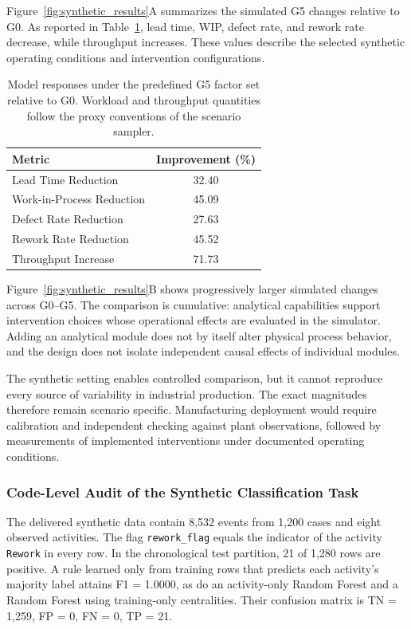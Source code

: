 Figure~\ref{fig:synthetic_results}A summarizes the simulated G5 changes relative to G0. As reported in Table~\ref{tab:synthetic_improvements}, lead time, WIP, defect rate, and rework rate decrease, while throughput increases. These values describe the selected synthetic operating conditions and intervention configurations.

\begin{table}[t]
\caption{
Model responses under the predefined G5 factor set relative to G0. Workload and throughput quantities follow the proxy conventions of the scenario sampler.
}
\label{tab:synthetic_improvements}
\centering
\begin{tabular}{lc}
\toprule
\textbf{Metric} & \textbf{Improvement (\%)} \\
\midrule
Lead Time Reduction & 32.40 \\
Work-in-Process Reduction & 45.09 \\
Defect Rate Reduction & 27.63 \\
Rework Rate Reduction & 45.52 \\
Throughput Increase & 71.73 \\
\bottomrule
\end{tabular}
\end{table}

Figure~\ref{fig:synthetic_results}B shows progressively larger simulated changes across G0--G5. The comparison is cumulative: analytical capabilities support intervention choices whose operational effects are evaluated in the simulator. Adding an analytical module does not by itself alter physical process behavior, and the design does not isolate independent causal effects of individual modules.

The synthetic setting enables controlled comparison, but it cannot reproduce every source of variability in industrial production. The exact magnitudes therefore remain scenario specific. Manufacturing deployment would require calibration and independent checking against plant observations, followed by measurements of implemented interventions under documented operating conditions.

\subsubsection{Code-Level Audit of the Synthetic Classification Task}
\label{subsec:synthetic_code_audit}

The delivered synthetic data contain 8,532 events from 1,200 cases and eight observed activities. The flag \texttt{rework\_flag} equals the indicator of the activity \texttt{Rework} in every row. In the chronological test partition, 21 of 1,280 rows are positive. A rule learned only from training rows that predicts each activity's majority label attains F1 = 1.0000, as do an activity-only Random Forest and a Random Forest using training-only centralities. Their confusion matrix is TN = 1,259, FP = 0, FN = 0, TP = 21.

